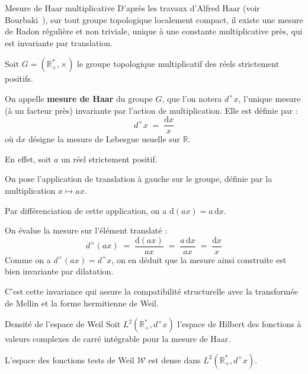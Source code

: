 \documentclass[Riemann_Hypothesis.tex]{subfiles}
\begin{document}
\begin{DefNef}[label=df:MesureHaar_fr]{Mesure de Haar multiplicative}
    D'après les travaux d'Alfred Haar (voir Bourbaki~\cite{Haar_bourbaki_integration_chap7}), 
    sur tout groupe topologique localement compact, 
    il existe une mesure de Radon régulière et non triviale, unique à une constante
    multiplicative près, qui est invariante par translation. \par
    Soit $G = \left(\mathbb{R}_+^*, \times\right)$ le groupe topologique multiplicatif 
    des réels strictement positifs. \par
    On appelle \textbf{mesure de Haar} du groupe $G$, que l'on notera $d^\times x$, 
    l'unique mesure (à un facteur près) invariante par l'action de multiplication. 
    Elle est définie par :
    \begin{equation*}
        d^\times x \;=\; \frac{\mathrm{d}x}{x}
    \end{equation*}
    où $\mathrm{d}x$ désigne la mesure de Lebesgue usuelle sur $\mathbb{R}$. \par
    En effet, soit $a$ un réel strictement positif. \par
    On pose l'application de translation à gauche sur le groupe, définie par la 
    multiplication $x \mapsto ax$. \par
    Par différenciation de cette application, on a $\mathrm{d}(ax) = a \, \mathrm{d}x$. \par
    On évalue la mesure sur l'élément translaté :
    \begin{equation*}
        d^\times (ax) \;=\; \frac{\mathrm{d}(ax)}{ax} \;=\; \frac{a \, \mathrm{d}x}{ax} \;=\; \frac{\mathrm{d}x}{x}
    \end{equation*}
    Comme on a $d^\times (ax) = d^\times x$, on en déduit que la mesure ainsi
    construite est bien invariante par dilatation.

    C'est cette invariance qui assure la compatibilité structurelle avec la
    transformée de Mellin et la forme hermitienne de Weil.
\end{DefNef}


\begin{lemma}[label=lm:DensiteWeil_fr]{Densité de l'espace de Weil}
    Soit $L^2(\mathbb{R}_+^*, d^\times x)$ l'espace de Hilbert des fonctions à
    valeurs complexes de carré intégrable pour la mesure de Haar. \par
    L'espace des fonctions tests de Weil $\mathcal{W}$ est dense dans
    $L^2(\mathbb{R}_+^*, d^\times x)$.
\end{lemma}
\end{document}
